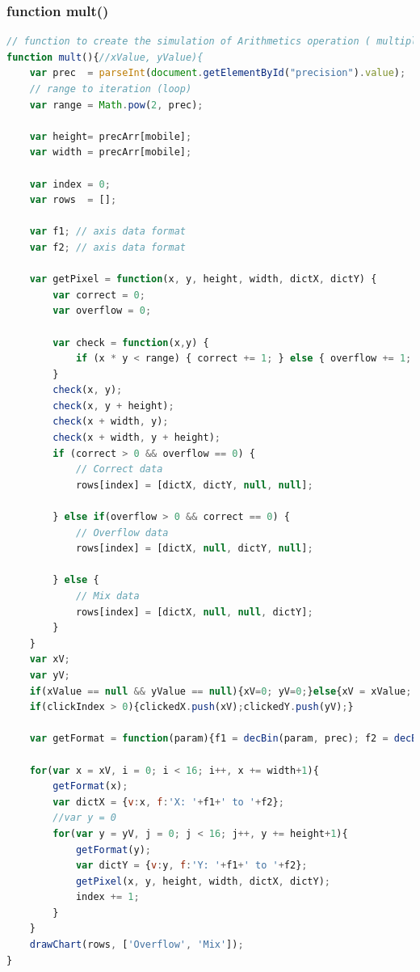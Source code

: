 \documentclass[11pt]{article}
\begin{document}
\subsubsection{function mult()}
\begin{lstlisting}[label={lst:mult}, language=Javascript, caption={mult function},]
// function to create the simulation of Arithmetics operation ( multiplication )
function mult(){//xValue, yValue){
	var prec  = parseInt(document.getElementById("precision").value);
	// range to iteration (loop)
	var range = Math.pow(2, prec);

	var height= precArr[mobile];
	var width = precArr[mobile];

	var index = 0;
	var rows  = [];

	var f1; // axis data format 
	var f2; // axis data format

	var getPixel = function(x, y, height, width, dictX, dictY) {
		var correct = 0;
		var overflow = 0;

		var check = function(x,y) {
			if (x * y < range) { correct += 1; } else { overflow += 1; }	
		}
		check(x, y);
		check(x, y + height);
		check(x + width, y);
		check(x + width, y + height);
		if (correct > 0 && overflow == 0) {
	    	// Correct data
			rows[index] = [dictX, dictY, null, null];

		} else if(overflow > 0 && correct == 0) {
			// Overflow data
			rows[index] = [dictX, null, dictY, null];

		} else {
			// Mix data
			rows[index] = [dictX, null, null, dictY];
		}
	}
	var xV;
	var yV; 
	if(xValue == null && yValue == null){xV=0; yV=0;}else{xV = xValue; yV = yValue;}
	if(clickIndex > 0){clickedX.push(xV);clickedY.push(yV);}
	
	var getFormat = function(param){f1 = decBin(param, prec); f2 = decBin(param+height, prec);}
	
	for(var x = xV, i = 0; i < 16; i++, x += width+1){
		getFormat(x);
		var dictX = {v:x, f:'X: '+f1+' to '+f2};
		//var y = 0
		for(var y = yV, j = 0; j < 16; j++, y += height+1){
			getFormat(y);
			var dictY = {v:y, f:'Y: '+f1+' to '+f2};
			getPixel(x, y, height, width, dictX, dictY);
			index += 1;
		}
	}
	drawChart(rows, ['Overflow', 'Mix']);
}

\end{lstlisting}
\end{document}
